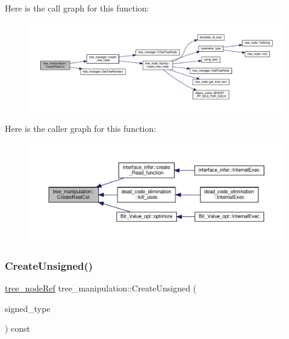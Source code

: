 Here is the call graph for this function\+:
\nopagebreak
\begin{figure}[H]
\begin{center}
\leavevmode
\includegraphics[width=350pt]{d0/d99/classtree__manipulation_ae075d962ddf33404b7dfcd9ff1172194_cgraph}
\end{center}
\end{figure}
Here is the caller graph for this function\+:
\nopagebreak
\begin{figure}[H]
\begin{center}
\leavevmode
\includegraphics[width=350pt]{d0/d99/classtree__manipulation_ae075d962ddf33404b7dfcd9ff1172194_icgraph}
\end{center}
\end{figure}
\mbox{\label{classtree__manipulation_af3f2f83696643419e666cf6d86221a95}} 
\subsubsection{\texorpdfstring{Create\+Unsigned()}{CreateUnsigned()}}
{\footnotesize\ttfamily \hyperlink{tree__node_8hpp_a6ee377554d1c4871ad66a337eaa67fd5}{tree\+\_\+node\+Ref} tree\+\_\+manipulation\+::\+Create\+Unsigned (\begin{DoxyParamCaption}\item[{const \hyperlink{tree__node_8hpp_a3cf5d02292c940f3892425a5b5fdec3c}{tree\+\_\+node\+Const\+Ref} \&}]{signed\+\_\+type }\end{DoxyParamCaption}) const}



